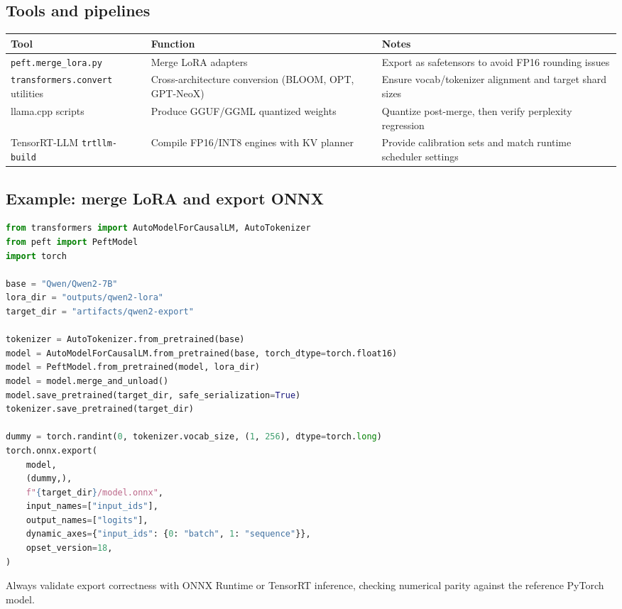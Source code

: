 \documentclass{article}
\begin{document}
\subsection{Tools and pipelines}
\begin{longtable}{p{3.2cm}p{4cm}p{6cm}}
\toprule
Tool & Function & Notes \\
\midrule
\texttt{peft.merge\_lora.py} & Merge LoRA adapters & Export as safetensors to avoid FP16 rounding issues \\
\texttt{transformers.convert} utilities & Cross-architecture conversion (BLOOM, OPT, GPT-NeoX) & Ensure vocab/tokenizer alignment and target shard sizes \\
llama.cpp scripts & Produce GGUF/GGML quantized weights & Quantize post-merge, then verify perplexity regression \\
TensorRT-LLM \texttt{trtllm-build} & Compile FP16/INT8 engines with KV planner & Provide calibration sets and match runtime scheduler settings \\
\bottomrule
\end{longtable}

\subsection{Example: merge LoRA and export ONNX}
\begin{lstlisting}[language=Python,caption={Consolidating LoRA adapters and exporting to ONNX}]
from transformers import AutoModelForCausalLM, AutoTokenizer
from peft import PeftModel
import torch

base = "Qwen/Qwen2-7B"
lora_dir = "outputs/qwen2-lora"
target_dir = "artifacts/qwen2-export"

tokenizer = AutoTokenizer.from_pretrained(base)
model = AutoModelForCausalLM.from_pretrained(base, torch_dtype=torch.float16)
model = PeftModel.from_pretrained(model, lora_dir)
model = model.merge_and_unload()
model.save_pretrained(target_dir, safe_serialization=True)
tokenizer.save_pretrained(target_dir)

dummy = torch.randint(0, tokenizer.vocab_size, (1, 256), dtype=torch.long)
torch.onnx.export(
    model,
    (dummy,),
    f"{target_dir}/model.onnx",
    input_names=["input_ids"],
    output_names=["logits"],
    dynamic_axes={"input_ids": {0: "batch", 1: "sequence"}},
    opset_version=18,
)
\end{lstlisting}
Always validate export correctness with ONNX Runtime or TensorRT inference, checking numerical parity against the reference PyTorch model.
\end{document}
